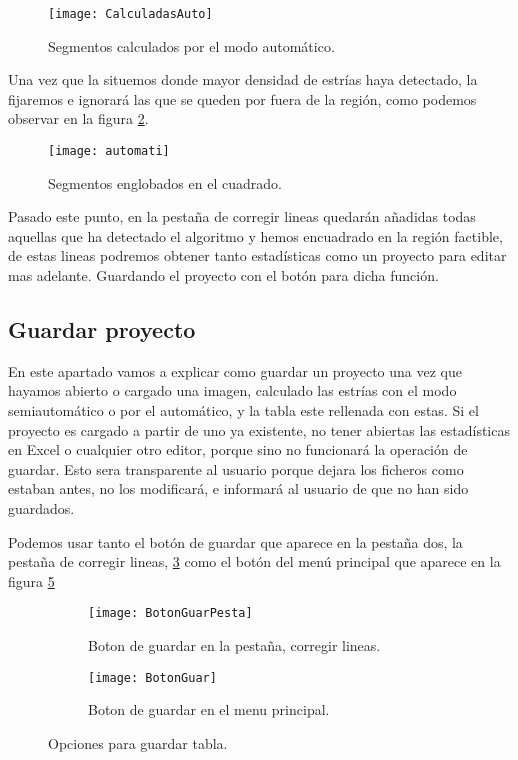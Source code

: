 \begin{figure}[h]
\centering
\texttt{[image: CalculadasAuto]}
\caption{Segmentos calculados por el modo automático.}
\label{fig:CalculadasAuto}
\end{figure}

Una vez que la situemos donde mayor densidad de estrías haya detectado, la fijaremos e ignorará las que se queden por fuera de la región, como podemos observar en la figura \ref{fig:automati}.

\begin{figure}[h]
\centering
\texttt{[image: automati]}
\caption{Segmentos englobados en el cuadrado.}
\label{fig:automati}
\end{figure}

Pasado este punto, en la pestaña de corregir lineas quedarán añadidas todas aquellas que ha detectado el algoritmo y hemos encuadrado en la región factible, de estas lineas podremos obtener tanto estadísticas como un proyecto para editar mas adelante. Guardando el proyecto con el botón para dicha función.

\subsection{Guardar proyecto}

En este apartado vamos a explicar como guardar un proyecto una vez que hayamos abierto o cargado una imagen, calculado las estrías con el modo semiautomático o por el automático, y la tabla este rellenada con estas. 
Si el proyecto es cargado a partir de uno ya existente, no tener abiertas las estadísticas en Excel o cualquier otro editor, porque sino no funcionará la operación de guardar. Esto sera transparente al usuario porque dejara los ficheros como estaban antes, no los modificará, e informará al usuario de que no han sido guardados. 

Podemos usar tanto el botón de guardar que aparece en la pestaña dos, la pestaña de corregir lineas, \ref{fig:BotonGuarPesta} como el botón del menú principal que aparece en la figura \ref{fig:BotonGuar}

\begin{figure}
	\begin{subfigure}[c]{.5\linewidth}
	\centering\large \texttt{[image: BotonGuarPesta]}
	\caption{Boton de guardar en la pestaña, corregir lineas.}\label{fig:BotonGuarPesta}
	\end{subfigure}%
	\begin{subfigure}[c]{.5\linewidth}
	\centering\large \texttt{[image: BotonGuar]}
	\caption{Boton de guardar en el menu principal.}\label{fig:BotonGuar}
	\end{subfigure}%
	\caption{Opciones para guardar tabla.}
\end{figure}
